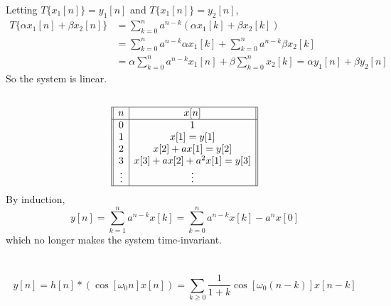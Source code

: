 \documentclass{article}
\begin{document}
Letting \(T\{x_1[n]\} = y_1[n]\) and \(T\{x_1[n]\} = y_2[n]\),
\begin{align}
    T\{\alpha x_1[n] + \beta x_2[n]\} &= \sum_{k = 0}^n a^{n - k} (\alpha x_1[k] + \beta x_2[k]) \\
    &= \sum_{k = 0}^n a^{n - k} \alpha x_1[k] + \sum_{k = 0}^n a^{n - k} \beta x_2[k] \\
    &= \alpha \sum_{k = 0}^n a^{n - k} x_1[n] + \beta \sum_{k = 0}^n x_2[k] = \alpha y_1[n] + \beta y_2[n]
\end{align}
So the system is linear.

\subsection{}

\begin{equation}
    \begin{array}[]{||c|c||}
        \hline
        n & x[n] \\
        \hline
        0 & 1 \\
        1 & x[1] = y[1] \\
        2 & x[2] + a x[1] = y[2] \\
        3 & x[3] + a x[2] + a^2 x[1] = y[3] \\
        \vdots & \vdots \\
        \hline
    \end{array}
\end{equation}
By induction,
\begin{equation}
    y[n] = \sum_{k = 1}^n a^{n - k} x[k] = \sum_{k = 0}^n a^{n - k} x[k] - a^n x[0]
\end{equation}
which no longer makes the system time-invariant.


\newpage
\section{}

\begin{equation}
    y[n] = h[n] \ast (\cos[\omega_0 n] x[n]) = \sum_{k \geqslant 0} \frac{1}{1 + k} \cos[\omega_0 (n - k)] x[n - k]
\end{equation}

\subsection{}
\end{document}
